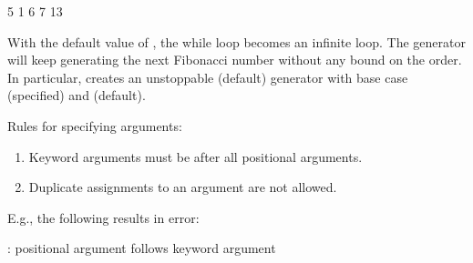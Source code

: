 \documentclass[letterpaper,10pt,english]{sphinxmanual}
\begin{document}
\begin{sphinxVerbatim}[commandchars=\\\{\}]
5
1
6
7
13
\end{sphinxVerbatim}

With the default value of , the while loop becomes an infinite loop. The generator will keep generating the next Fibonacci number without any bound on the order. In particular,  creates an unstoppable (default) generator with base case  (specified) and  (default).

Rules for specifying arguments:
\begin{enumerate}
%
\item {} 
Keyword arguments must be after all positional arguments.

\item {} 
Duplicate assignments to an argument are not allowed.

\end{enumerate}

E.g., the following results in error:

\begin{sphinxVerbatim}[commandchars=\\\{\}]
 
\end{sphinxVerbatim}

\begin{sphinxVerbatim}[commandchars=\\\{\}]
     
: positional argument follows keyword argument
\end{sphinxVerbatim}

\begin{sphinxVerbatim}[commandchars=\\\{\}]
 
\end{sphinxVerbatim}
\end{document}
